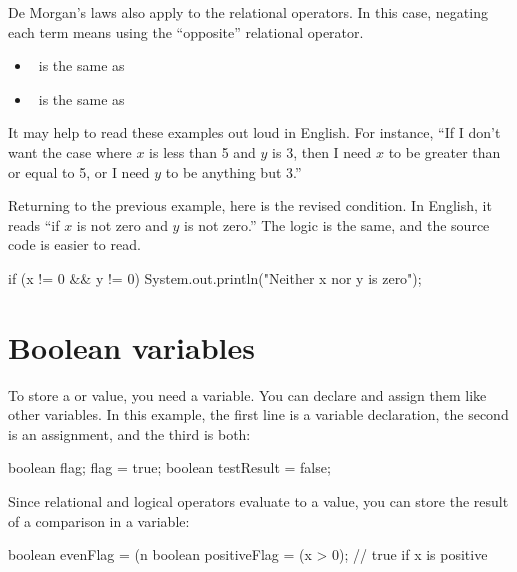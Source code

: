 De Morgan's laws also apply to the relational operators.
In this case, negating each term means using the ``opposite'' relational operator.

\begin{itemize}
\item {} ~is the same as~ 
\item {} ~is the same as~ 
\end{itemize}

It may help to read these examples out loud in English.
For instance, ``If I don't want the case where $x$ is less than 5 and $y$ is 3, then I need $x$ to be greater than or equal to 5, or I need $y$ to be anything but 3.''

Returning to the previous example, here is the revised condition.
In English, it reads ``if $x$ is not zero and $y$ is not zero.''
The logic is the same, and the source code is easier to read.

\begin{code}
if (x != 0 && y != 0) {
    System.out.println("Neither x nor y is zero");
}
\end{code}


\section{Boolean variables}


To store a  or  value, you need a  variable.
You can declare and assign them like other variables.
In this example, the first line is a variable declaration, the second is an assignment, and the third is both:

\begin{code}
boolean flag;
flag = true;
boolean testResult = false;
\end{code}


Since relational and logical operators evaluate to a  value, you can store the result of a comparison in a variable:

\begin{code}
boolean evenFlag = (n %
boolean positiveFlag = (x > 0);     // true if x is positive
\end{code}



